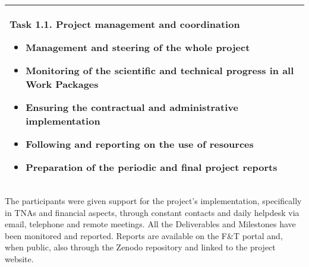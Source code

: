 \begin{table}[H]
\begin{tabular}{|p{}|}
        \begin{minipage}[t]{\textwidth}
        \setlength{\parindent}{15pt}
                Task 1.1. Project management and coordination
    		\begin{itemize}
    		    \item Management and steering of the whole project
                    \item Monitoring of the scientific and technical progress in all Work Packages
                    \item Ensuring the contractual and administrative implementation
                    \item Following and reporting on the use of resources
                    \item Preparation of the periodic and final project reports
    		\end{itemize} 
    		\vspace*{0.10em}
	\end{minipage}        
        \\
        \hline
    \end{tabular}
    \vspace{0.5em}\vfill
\end{table}

The participants were given support for the project's implementation, specifically in TNAs and financial aspects, through constant contacts and daily helpdesk via email, telephone and remote meetings.
All the Deliverables and Milestones have been monitored and reported. Reports are available on the F\&T portal and, when public, also through the Zenodo repository and linked to the project website.

